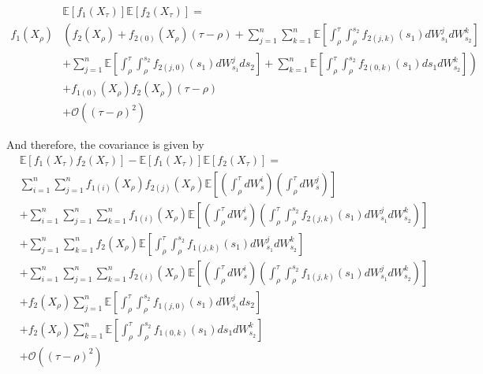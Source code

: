 \documentclass[12pt]{article}
\begin{document}
\begin{equation}
\begin{aligned}
& \mathbb{E}[f_1(X_\tau)]\mathbb{E}[f_2(X_\tau)] = \\
f_1(X_\rho) 
& \left(  f_2(X_\rho) 
 + f_{2(0)} (X_\rho) (\tau - \rho) 
 + \sum_{j=1}^n \sum_{k=1}^n \mathbb{E} \left[ \int_\rho^\tau \int_\rho^{s_2} f_{2(j,k)} (s_1) dW_{s_1}^j dW_{s_2}^k  \right] \right. \\
& \left. + \sum_{j=1}^n \mathbb{E} \left[ \int_\rho^\tau \int_\rho^{s_2} f_{2(j,0)} (s_1) dW_{s_1}^j ds_2 \right] 
 + \sum_{k=1}^n \mathbb{E} \left[ \int_\rho^\tau \int_\rho^{s_2} f_{2(0,k)} (s_1) ds_1 dW_{s_2}^k \right]\right) \\
& + f_{1(0)} (X_\rho) f_2(X_\rho) (\tau - \rho) \\
& + \mathcal{O} ((\tau - \rho)^2)
\end{aligned}
\end{equation}

And therefore, the covariance is given by
\begin{equation}
\begin{aligned}
&\mathbb{E} \left[ f_1(X_\tau) f_2(X_\tau) \right] - \mathbb{E}[f_1(X_\tau)]\mathbb{E}[f_2(X_\tau)] = \\
& \sum_{i=1}^n \sum_{j=1}^n f_{1(i)} (X_\rho) f_{2(j)} (X_\rho) \mathbb{E} \left[ \left( \int_\rho^\tau dW_s^i \right) \left( \int_\rho^\tau dW_s^j \right) \right] \\
& + \sum_{i=1}^n \sum_{j=1}^n \sum_{k=1}^n f_{1(i)} (X_\rho) \mathbb{E} \left[ \left( \int_\rho^\tau dW_s^i  \right) \left( \int_\rho^\tau \int_\rho^{s_2} f_{2(j,k)} (s_1) dW_{s_1}^j dW_{s_2}^k  \right) \right] \\
&+ \sum_{j=1}^n \sum_{k=1}^n f_2(X_\rho) \mathbb{E} \left[ \int_\rho^\tau \int_\rho^{s_2} f_{1(j,k)} (s_1) dW_{s_1}^j dW_{s_2}^k \right] \\
& + \sum_{i=1}^n \sum_{j=1}^n \sum_{k=1}^n  f_{2(i)} (X_\rho)  \mathbb{E} \left[ \left( \int_\rho^\tau dW_s^i \right)  \left( \int_\rho^\tau \int_\rho^{s_2} f_{1(j,k)} (s_1) dW_{s_1}^j dW_{s_2}^k \right) \right] \\
& + f_2(X_\rho) \sum_{j=1}^n \mathbb{E} \left[  \int_\rho^\tau \int_\rho^{s_2} f_{1(j,0)} (s_1) dW_{s_1}^j ds_2 \right] \\
& + f_2(X_\rho) \sum_{k=1}^n \mathbb{E} \left[ \int_\rho^\tau \int_\rho^{s_2} f_{1(0,k)} (s_1) ds_1 dW_{s_2}^k \right] \\
&+ \mathcal{O} ((\tau - \rho)^2 ) 
\end{aligned}
\end{equation}
\end{document}

